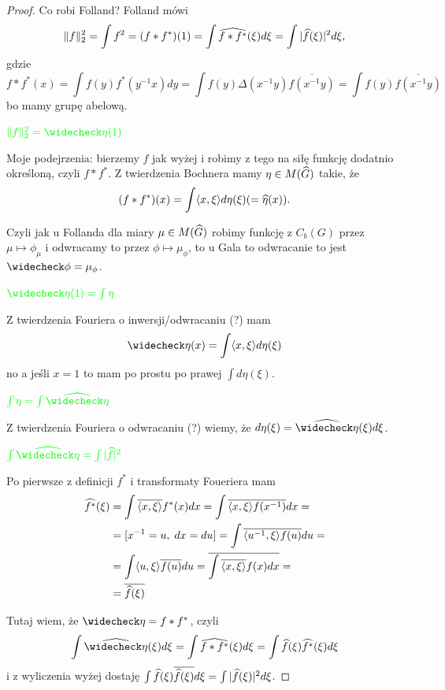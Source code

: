\begin{proof}
  Co robi Folland? Folland mówi
  $$\|f\|_2^2=\int f^2=(f\ast f^*)(1)=\int\Hat{f\ast f^*}(\xi)d\xi=\int |\Hat{f}(\xi)|^2d\xi,$$
  gdzie 
  $$f\ast f^*(x)=\int f(y)f^*(y^{-1}x)dy=\int f(y)\Delta(x^{-1}y)\overline{f(x^{-1}y)}=\int f(y)\overline{f(x^{-1}y)}$$
  bo mamy grupę abelową.

  $\color{green}\|f\|_2^2=\taH{\eta}(1)$

  Moje podejrzenia: bierzemy $f$ jak wyżej i robimy z tego na siłę funkcję dodatnio określoną, czyli $f\ast f^*$. Z twierdzenia Bochnera mamy $\eta\in M(\Hat{G})$ takie, że 
  $$(f\ast f^*)(x)=\int\langle x, \xi\rangle d\eta(\xi)(=\Hat{\eta}(x)).$$

  Czyli jak u Follanda dla miary $\mu\in M(\Hat{G})$ robimy funkcję z $C_b(G)$ przez $\mu\mapsto \phi_\mu$ i odwracamy to przez $\phi\mapsto \mu_\phi$, to u Gala to odwracanie to jest $\taH{\phi}=\mu_\phi$. 
  
  $\color{green}\taH{\eta}(1)=\int \eta$

  Z twierdzenia Fouriera o inwersji/odwracaniu (?) mam
  $$\taH{\eta}(x)=\int \langle x, \xi\rangle d\eta(\xi)$$
  no a jeśli $x=1$ to mam po prostu po prawej $\int d\eta(\xi)$.

  $\color{green}\int\eta=\int\Hat{\taH{\eta}}$

  Z twierdzenia Fouriera o odwracaniu (?) wiemy, że $d\eta(\xi)=\Hat{\taH{\eta}}(\xi)d\xi$. 

  $\color{green}\int\Hat{\taH{\eta}}=\int |\Hat{f}|^2$
  
  Po pierwsze z definicji $f^*$ i transformaty Foueriera mam
  \begin{align*}
    \Hat{f^*}(\xi)&=\int \overline{\langle x, \xi\rangle}f^*(x)dx=\int\overline{\langle x,\xi\rangle f(x^{-1})}dx=\\ 
                  &=[x^{-1}=u,\;dx=du]=\int \overline{\langle u^{-1}, \xi\rangle f(u)}du=\\ 
                  &=\int\langle u,\xi\rangle \overline{f(u)}du=\overline{\int \overline{\langle x, \xi\rangle}f(x)dx}=\\ 
                  &=\overline{\Hat{f}(\xi)}
  \end{align*}

  Tutaj wiem, że $\taH{\eta}=f\ast f^*$, czyli
  $$\int \Hat{\taH{\eta}}(\xi)d\xi=\int \Hat{f\ast f^*}(\xi)d\xi=\int \Hat{f}(\xi)\Hat{f^*}(\xi)d\xi$$
  i z wyliczenia wyżej dostaję $\int \Hat{f}(\xi)\overline{\Hat{f}(\xi)}d\xi=\int |\Hat{f}(\xi)|^2d\xi$.
\end{proof}

